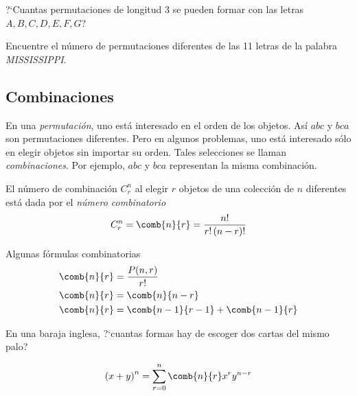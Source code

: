 {}
\begin{ejemplo}
 \label{exmp:0.1.16}
 ?`Cuantas permutaciones de longitud 3 se pueden formar con las letras $A,B,C,D,E,F,G$?
\end{ejemplo}


{}
\begin{ejemplo}
 \label{exmp:0.1.17}
 Encuentre el número de permutaciones diferentes de las 11 letras de la palabra \emph{MISSISSIPPI}.
\end{ejemplo}


\subsection{Combinaciones}
{}
En una \emph{permutación}, uno está interesado en el orden de los objetos. Así $abc$ y $bca$ son permutaciones diferentes.  Pero en algunos problemas, uno está interesado sólo en elegir objetos sin importar su orden.  Tales selecciones se llaman \emph{combinaciones}.  Por ejemplo, $abc$ y $bca$ representan la misma combinación.



 El número de combinación $ C^{n}_{r} $ al elegir $r$ objetos de una colección de $n$ diferentes está dada por el \emph{número combinatorio}
  \begin{align}
   \label{eq:0.1.29}
  C^{n}_{r} = \comb{n}{r}=\dfrac{n!}{r!\left( n-r \right)!}
  \end{align}



{Algunas fórmulas combinatorias}
\begin{align}
 \label{eq:0.1.30}
 \comb{n}{r}&=\dfrac{P(n,r)}{r!} \\
 \label{eq:0.1.31}
 \comb{n}{r}&=\comb{n}{n-r}\\
 \comb{n}{r}&=\comb{n-1}{r-1}+\comb{n-1}{r}
\end{align}


{}
\begin{ejemplo}
 \label{exmp:0.1.18}
 En una baraja inglesa, ?`cuantas formas hay de escoger dos cartas del mismo palo?
\end{ejemplo}


{}
\begin{thm}
 \begin{align}
  \label{eq:0.1.32}
  \left( x+y \right)^{n} = \sum_{r=0}^{n}\comb{n}{r}x^{r}y^{n-r}
 \end{align}

\end{thm}


